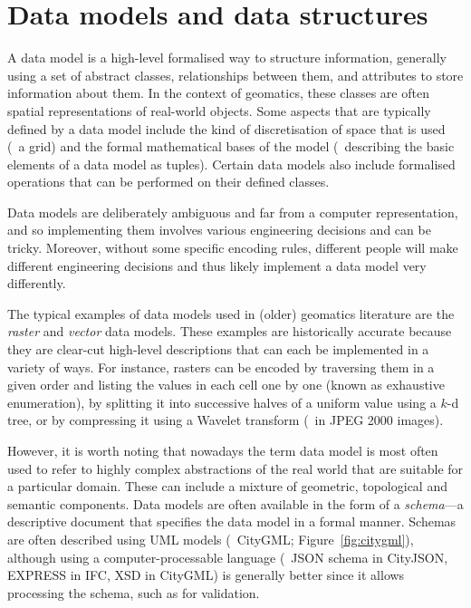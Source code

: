 \section{Data models and data structures}

A data model is a high-level formalised way to structure information, generally using a set of abstract classes, relationships between them, and attributes to store information about them.
In the context of geomatics, these classes are often spatial representations of real-world objects.
Some aspects that are typically defined by a data model include the kind of discretisation of space that is used (\eg\ a grid) and the formal mathematical bases of the model (\eg\ describing the basic elements of a data model as tuples).
Certain data models also include formalised operations that can be performed on their defined classes.

Data models are deliberately ambiguous and far from a computer representation, and so implementing them involves various engineering decisions and can be tricky.
Moreover, without some specific encoding rules, different people will make different engineering decisions and thus likely implement a data model very differently.

The typical examples of data models used in (older) geomatics literature are the \emph{raster} and \emph{vector} data models.
These examples are historically accurate because they are clear-cut high-level descriptions that can each be implemented in a variety of ways.
For instance, rasters can be encoded by traversing them in a given order and listing the values in each cell one by one (known as exhaustive enumeration), by splitting it into successive halves of a uniform value using a $k$-d tree, or by compressing it using a Wavelet transform (\eg\ in JPEG 2000 images).

However, it is worth noting that nowadays the term data model is most often used to refer to highly complex abstractions of the real world that are suitable for a particular domain.
These can include a mixture of geometric, topological and semantic components.
Data models are often available in the form of a \emph{schema}---a descriptive document that specifies the data model in a formal manner.
Schemas are often described using UML models (\eg\ CityGML; Figure~\ref{fig:citygml}), although using a computer-processable language (\eg\ JSON schema in CityJSON, EXPRESS in IFC, XSD in CityGML) is generally better since it allows processing the schema, such as for validation.


